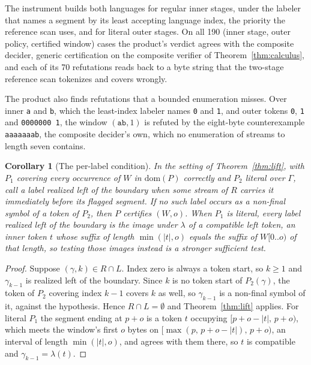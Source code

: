 \documentclass[11pt,a4paper]{article}
\theoremstyle{definition}
\theoremstyle{plain}
\newtheorem{corollary}{Corollary}
\newcommand{\code}[1]{\texttt{#1}}
\begin{document}
The instrument builds both languages for regular inner stages, under the labeler that names a segment by its least
accepting language index, the priority the reference scan uses, and for literal outer stages. On all 190 (inner stage,
outer policy, certified window) cases the product's verdict agrees with the composite decider, generic certification on
the composite verifier of Theorem~\ref{thm:calculus}, and each of its 70 refutations reads back to a byte string that
the two-stage reference scan tokenizes and covers wrongly.

The product also finds refutations that a bounded enumeration misses. Over inner \code{a} and \code{b}, which the
least-index labeler names \code{0} and \code{1}, and outer tokens \code{0}, \code{1} and \code{0000000\,1}, the window
$(\code{ab}, 1)$ is refuted by the eight-byte counterexample \code{aaaaaaab}, the composite decider's own, which no
enumeration of streams to length seven contains.

\begin{corollary}[The per-label condition]\label{cor:labels}
In the setting of Theorem~\ref{thm:lift}, with $P_1$ covering every occurrence of $W$ in $\mathrm{dom}(P)$ correctly and
$P_2$ literal over $\Gamma$, call a label \emph{realized left of the boundary} when some stream of $R$ carries it
immediately before its flagged segment. If no such label occurs as a non-final symbol of a token of $P_2$, then $P$
certifies $(W,o)$. When $P_1$ is literal, every label realized left of the boundary is the image under $\lambda$ of a
\emph{compatible left token}, an inner token $t$ whose suffix of length $\min(|t|, o)$ equals the suffix of $W[0..o)$ of
that length, so testing those images instead is a stronger sufficient test.
\end{corollary}

\begin{proof}
Suppose $(\gamma, k) \in R \cap L$. Index zero is always a token start, so $k \ge 1$ and $\gamma_{k-1}$ is realized left
of the boundary. Since $k$ is no token start of $P_2(\gamma)$, the token of $P_2$ covering index $k-1$ covers $k$ as
well, so $\gamma_{k-1}$ is a non-final symbol of it, against the hypothesis. Hence $R \cap L = \emptyset$ and
Theorem~\ref{thm:lift} applies. For literal $P_1$ the segment ending at $p+o$ is a token $t$ occupying
$[p+o-|t|,\,p+o)$, which meets the window's first $o$ bytes on $[\max(p,\,p+o-|t|),\,p+o)$, an interval of length
$\min(|t|, o)$, and agrees with them there, so $t$ is compatible and $\gamma_{k-1} = \lambda(t)$.
\end{proof}
\end{document}
